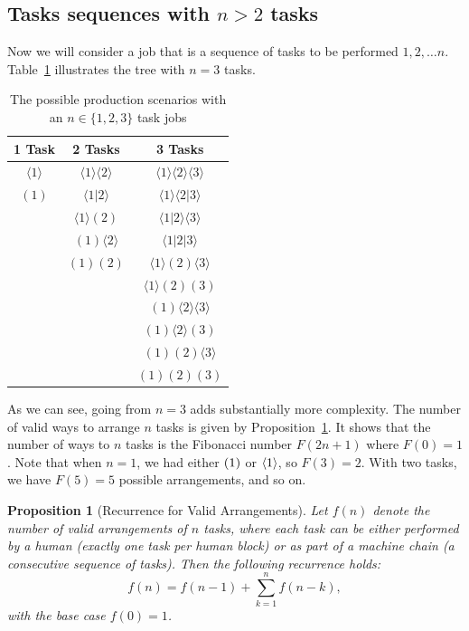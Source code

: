 \documentclass{article}
\newtheorem{proposition}[theorem]{Proposition}
\begin{document}
\subsection{Tasks sequences with $n > 2$ tasks}
Now we will consider a job that is a sequence of tasks to be performed $1, 2, \ldots n$.
Table~\ref{tab:tree} illustrates the tree with $n=3$ tasks.

\begin{table}
  \centering
  \caption{The possible production scenarios with an $n \in \{1,2,3\}$ task jobs}
  \label{tab:tree}
  \begin{tabular}{ccc}
  \hline
  1 Task & 2 Tasks & 3 Tasks \\
  \hline
  $\langle 1 \rangle$ & $\langle 1 \rangle \langle 2 \rangle$ & $\langle 1 \rangle \langle 2 \rangle \langle 3 \rangle$ \\
  $(1)$ & $\langle 1|2 \rangle$ & $\langle 1 \rangle \langle 2|3 \rangle$ \\
  & $\langle 1 \rangle (2)$ & $\langle 1|2 \rangle \langle 3 \rangle$ \\
  & $(1) \langle 2 \rangle$ & $\langle 1|2|3 \rangle$ \\
  & $(1) (2)$ & $\langle 1 \rangle (2) \langle 3 \rangle$ \\
  & & $\langle 1 \rangle (2) (3)$ \\
  & & $(1) \langle 2 \rangle \langle 3 \rangle$ \\
  & & $(1) \langle 2 \rangle (3)$ \\
  & & $(1) (2) \langle 3 \rangle$ \\
  & & $(1) (2) (3)$ \\
  \hline
  \end{tabular}
  \end{table}

As we can see, going from $n=3$ adds substantially more complexity.
The number of valid ways to arrange $n$ tasks is given by Proposition~\ref{proposition:num_arrangements}.
It shows that the number of ways to $n$ tasks is the Fibonacci number $F(2n+1)$ where $F(0) = 1$.
Note that when $n=1$, we had either $( 1 )$ or $\langle 1 \rangle$, so $F(3) = 2$.
With two tasks, we have $F(5) = 5$ possible arrangements, and so on. 

\begin{proposition}[Recurrence for Valid Arrangements] \label{proposition:num_arrangements}
  Let $f(n)$ denote the number of valid arrangements of $n$ tasks, where each task can be either performed by a human (exactly one task per human block) or as part of a machine chain (a consecutive sequence of tasks). Then the following recurrence holds:
  \[
  f(n) = f(n-1) + \sum_{k=1}^{n} f(n-k),
  \]
  with the base case $f(0) = 1$.
  \end{proposition}
  
\end{document}
